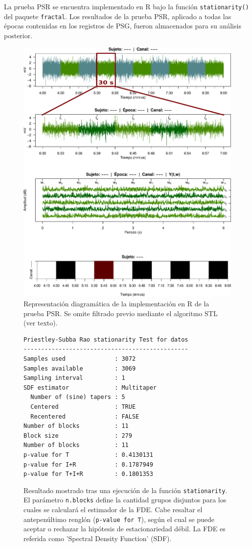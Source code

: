 La prueba PSR se encuentra implementado en R bajo la funci\'on \texttt{stationarity()} del paquete 
\texttt{fractal}.
Los resultados de la prueba PSR, aplicado a todas las \'epocas contenidas en los registros de PSG,
fueron almacenados para su an\'alisis posterior.

\begin{figure}
\centering
\includegraphics[width=0.7\linewidth]{./img_diagramas/psr_simple.pdf}
\caption{Representaci\'on diagram\'atica de la implementaci\'on en R de la prueba PSR. Se omite 
filtrado previo mediante el algoritmo STL (ver texto).}
\label{diagrama_psr}
\end{figure}

\begin{figure}
\centering
\begin{lstlisting}[caption={}]
Priestley-Subba Rao stationarity Test for datos
-----------------------------------------------
Samples used              : 3072 
Samples available         : 3069 
Sampling interval         : 1 
SDF estimator             : Multitaper 
  Number of (sine) tapers : 5 
  Centered                : TRUE 
  Recentered              : FALSE 
Number of blocks          : 11 
Block size                : 279 
Number of blocks          : 11 
p-value for T             : 0.4130131 
p-value for I+R           : 0.1787949 
p-value for T+I+R         : 0.1801353 
\end{lstlisting}
\caption{Resultado mostrado tras una ejecuci\'on de la funci\'on \texttt{stationarity}.
El par\'ametro \texttt{n.blocks} define la cantidad grupos disjuntos para los cuales se 
calcular\'a el estimador de la FDE.
Cabe resaltar el antepen\'ultimo rengl\'on (\texttt{p-value for T}), seg\'un el cual se puede
aceptar o rechazar la hip\'otesis de estacionariedad d\'ebil.
La FDE es referida como 'Spectral Density Function' (SDF).}
\label{res_psr}
\end{figure}

